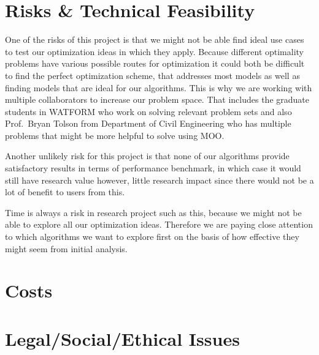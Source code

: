 \documentclass[11pt]{article}
\begin{document}
\section{Risks \& Technical Feasibility}
One of the risks of this project is that we might not be able find
ideal use cases to test our optimization ideas in which they apply.
Because different optimality problems have various possible routes for
optimization it could both be difficult to find the perfect
optimization scheme, that addresses most models as well as finding
models that are ideal for our algorithms. This is why we are working
with multiple collaborators to increase our problem space. That
includes the graduate students in WATFORM who work on solving relevant
problem sets and also Prof.\ Bryan Tolson from Department of Civil
Engineering who has multiple problems that might be more helpful to
solve using MOO.\@

Another unlikely risk for this project is that none of our algorithms
provide satisfactory results in terms of performance benchmark, in
which case it would still have research value however, little research
impact since there would not be a lot of benefit to users from this.

Time is always a risk in research project such as this, because we
might not be able to explore all our optimization ideas. Therefore we
are paying close attention to which algorithms we want to explore first
on the basis of how effective they might seem from initial analysis.

\section{Costs}

\section{Legal/Social/Ethical Issues}

\printbibliography[heading=bibintoc]
\end{document}
